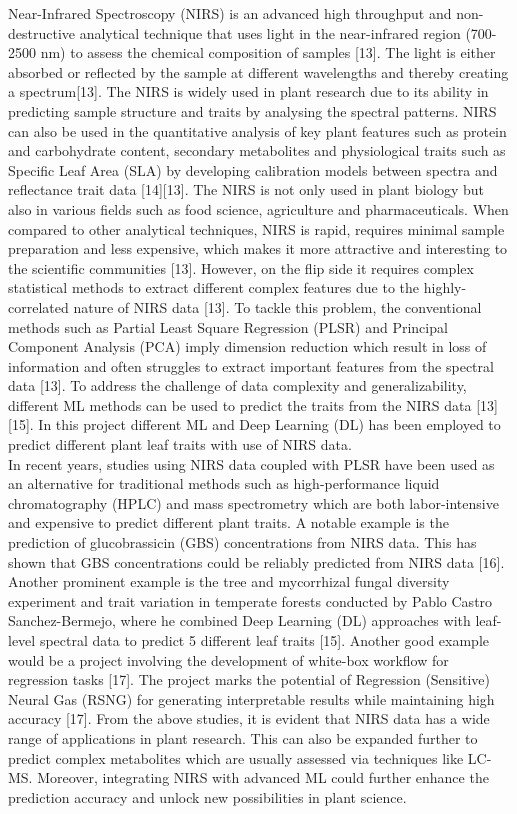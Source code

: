 \documentclass[12pt,a4paper]{report}
\begin{document}
Near-Infrared Spectroscopy (NIRS) is an advanced high throughput and non-destructive analytical technique that uses light in the near-infrared region (700-2500 nm) to assess the chemical composition of samples [13]. The light is either absorbed or reflected by the sample at different wavelengths and thereby creating a spectrum[13]. The NIRS is widely used in plant research due to its ability in predicting sample structure and traits by analysing the spectral patterns.
NIRS can also be used in the quantitative analysis of key plant features such as protein and carbohydrate content, secondary metabolites and physiological traits such as Specific Leaf Area (SLA) by developing calibration models between spectra and reflectance trait data [14][13]. The NIRS is not only used in plant biology but also in various fields such as food science, agriculture and pharmaceuticals. When compared to other analytical techniques, NIRS is rapid, 
requires minimal sample preparation and less expensive, which makes it more attractive and interesting to the scientific communities [13]. However, on the flip side it requires complex statistical methods to extract different complex features due to the highly-correlated nature of NIRS data [13]. To tackle this problem, the conventional methods such as Partial Least Square Regression (PLSR) and Principal Component Analysis (PCA) imply dimension reduction which 
result in loss of information and often struggles to extract important features from the spectral data [13]. To address the challenge of data complexity and generalizability, different ML methods can be used to predict the traits from the NIRS data [13][15]. In this project different ML and Deep Learning (DL) has been employed to predict different plant leaf traits with use of NIRS data. \\


In recent years, studies using NIRS data coupled with PLSR have been used as an alternative for traditional methods such as high-performance liquid chromatography (HPLC) and mass spectrometry which are both labor-intensive and expensive to predict different plant traits. A notable example is the prediction of glucobrassicin (GBS) concentrations from NIRS data. This has shown that GBS 
concentrations could be reliably predicted from NIRS data [16]. Another prominent example is the tree and mycorrhizal fungal diversity experiment and  trait variation in temperate forests  conducted by Pablo Castro Sanchez-Bermejo, where he combined Deep Learning (DL) approaches with leaf-level spectral data to predict 5 different leaf traits [15]. Another good  example would be a 
project involving the development of white-box  workflow for regression tasks [17]. The project marks the potential of Regression (Sensitive) Neural Gas (RSNG) for generating interpretable results while maintaining high accuracy [17]. From the above studies, it is evident that NIRS data has a wide range of applications in plant research. This can also be expanded further to predict 
complex metabolites which are usually assessed via techniques like LC-MS. Moreover, integrating NIRS with advanced ML could further enhance the prediction accuracy and unlock new possibilities in plant science. \\
\end{document}
